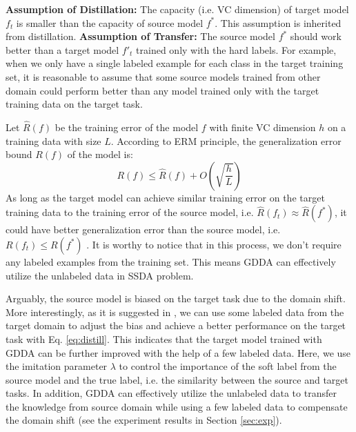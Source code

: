 \textbf{Assumption of Distillation:} The capacity (i.e. VC dimension) of target model $f_t$ is smaller than the capacity of source model $f^*$. This assumption is inherited from distillation.
\textbf{Assumption of Transfer:} The source model $f^*$ should work better than a target model $f'_t$ trained only with the hard labels. For example, when we only have a single labeled example for each class in the target training set, it is reasonable to assume that some source models trained from other domain could perform better than any model trained only with the target training data on the target task.

Let $\hat{R}(f)$ be the training error of the model $f$ with finite VC dimension $h$ on a training data with size $L$. According to ERM principle, the generalization error bound $R(f)$ of the model is:
\begin{equation}
R(f) \leq \hat{R}(f)+O\left(\sqrt{\frac{h}{L}}\right)
\end{equation}
As long as the target model can achieve similar training error on the target training data to the training error of the source model, i.e. $\hat{R}(f_t) \approx \hat{R}(f^*)$, it could have better generalization error than the source model, i.e. $R(f_t)\le R(f^*)$ \cite{hinton2015distilling}. 
It is worthy to notice that in this process, we don't require any labeled examples from the training set. This means GDDA can effectively utilize the unlabeled data in SSDA problem.

Arguably, the source model is biased on the target task due to the domain shift. More interestingly, as it is suggested in \cite{hinton2015distilling}, we can use some labeled data from the target domain to adjust the bias and achieve a better performance on the target task with Eq. \eqref{eq:distill}. This indicates that the target model trained with GDDA can be further improved with the help of a few labeled data. Here, we use the imitation parameter $\lambda$ to control the importance of the soft label from the source model and the true label, i.e. the similarity between the source and target tasks. In addition, GDDA can effectively utilize the unlabeled data to transfer the knowledge from source domain while using a few labeled data to compensate the domain shift (see the experiment results in Section \ref{sec:exp}).

